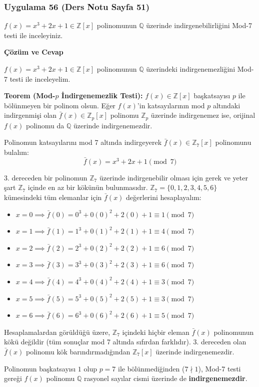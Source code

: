 \documentclass[11pt, a4paper]{article}
\newenvironment{cozum}{
    \vspace{0.5cm}
    \noindent\textcolor{green!60!black}{\faCheckCircle\enspace \textbf{\Large Çözüm ve Cevap}}\par\vspace{0.2cm}
}{}
\begin{document}
\newpage
\subsubsection{Uygulama 56 (Ders Notu Sayfa 51)}
\begin{sorubox}
$f(x)=x^3+2x+1 \in \mathbb{Z}[x]$ polinomunun $\mathbb{Q}$ üzerinde indirgenebilirliğini Mod-7 testi ile inceleyiniz.
\end{sorubox}
\begin{cozum}
$f(x) = x^{3} + 2x + 1 \in \mathbb{Z}[x]$ polinomunun $\mathbb{Q}$ üzerindeki indirgenemezliğini Mod-7 testi ile inceleyelim.

\textbf{Teorem (Mod-$p$ İndirgenemezlik Testi):} $f(x) \in \mathbb{Z}[x]$ başkatsayısı $p$ ile bölünmeyen bir polinom olsun. Eğer $f(x)$'in katsayılarının mod $p$ altındaki indirgenmişi olan $\bar{f}(x) \in \mathbb{Z}_p[x]$ polinomu $\mathbb{Z}_p$ üzerinde indirgenemez ise, orijinal $f(x)$ polinomu da $\mathbb{Q}$ üzerinde indirgenemezdir.

Polinomun katsayılarını mod 7 altında indirgeyerek $\bar{f}(x) \in \mathbb{Z}_{7}[x]$ polinomunu bulalım:
\[ \bar{f}(x) = x^{3} + 2x + 1 \pmod{7} \]

3. dereceden bir polinomun $\mathbb{Z}_{7}$ üzerinde indirgenebilir olması için gerek ve yeter şart $\mathbb{Z}_{7}$ içinde en az bir kökünün bulunmasıdır. $\mathbb{Z}_{7} = \{0, 1, 2, 3, 4, 5, 6\}$ kümesindeki tüm elemanlar için $\bar{f}(x)$ değerlerini hesaplayalım:
\begin{itemize}
    \item $x = 0 \implies \bar{f}(0) = 0^3 + 0(0)^2 + 2(0) + 1 \equiv 1 \pmod{7}$
    \item $x = 1 \implies \bar{f}(1) = 1^3 + 0(1)^2 + 2(1) + 1 \equiv 4 \pmod{7}$
    \item $x = 2 \implies \bar{f}(2) = 2^3 + 0(2)^2 + 2(2) + 1 \equiv 6 \pmod{7}$
    \item $x = 3 \implies \bar{f}(3) = 3^3 + 0(3)^2 + 2(3) + 1 \equiv 6 \pmod{7}$
    \item $x = 4 \implies \bar{f}(4) = 4^3 + 0(4)^2 + 2(4) + 1 \equiv 3 \pmod{7}$
    \item $x = 5 \implies \bar{f}(5) = 5^3 + 0(5)^2 + 2(5) + 1 \equiv 3 \pmod{7}$
    \item $x = 6 \implies \bar{f}(6) = 6^3 + 0(6)^2 + 2(6) + 1 \equiv 5 \pmod{7}$
\end{itemize}

Hesaplamalardan görüldüğü üzere, $\mathbb{Z}_{7}$ içindeki hiçbir eleman $\bar{f}(x)$ polinomunun kökü değildir (tüm sonuçlar mod 7 altında sıfırdan farklıdır). 3. dereceden olan $\bar{f}(x)$ polinomu kök barındırmadığından $\mathbb{Z}_{7}[x]$ üzerinde indirgenemezdir.

Polinomun başkatsayısı $1$ olup $p = 7$ ile bölünmediğinden ($7 \nmid 1$), Mod-7 testi gereği $f(x)$ polinomu $\mathbb{Q}$ rasyonel sayılar cismi üzerinde de \textbf{indirgenemezdir}.
\end{cozum}
\end{document}
